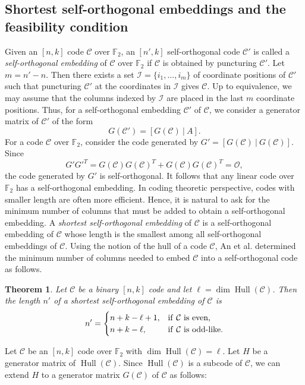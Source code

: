\documentclass{article}
\newtheorem{theorem}{Theorem}
\newcommand{\Hull}{\operatorname{Hull}}
\begin{document}
\subsection{Shortest self-orthogonal embeddings and the feasibility condition}
Given an $[n, k]$ code $\mathcal{C}$ over $\mathbb{F}_2$, an $[n', k]$ self-orthogonal code $\mathcal{C}'$ is called a \textit{self-orthogonal embedding} of $\mathcal{C}$ over $\mathbb{F}_2$ if $\mathcal{C}$ is obtained by puncturing $\mathcal{C}'$. Let $m = n'-n$. Then there exists a set $\mathcal{I}=\{i_1,\ldots,i_m\}$ of coordinate positions of $\mathcal{C}'$ such that puncturing $\mathcal{C}'$ at the coordinates in $\mathcal{I}$ gives $\mathcal{C}$. Up to equivalence, we may assume that the columns indexed by $\mathcal{I}$ are placed in the last $m$ coordinate positions. Thus, for a self-orthogonal embedding $\mathcal{C}'$ of $\mathcal{C}$, we consider a generator matrix of $\mathcal{C}'$ of the form \[
G(\mathcal{C}') = [G(\mathcal{C})~|~A].
\]
For a code $\mathcal{C}$ over $\mathbb{F}_2$, consider the code generated by $G' = [G(\mathcal{C})~|~G(\mathcal{C})]$. Since
\[
G'G'^T = G(\mathcal{C})G(\mathcal{C})^T + G(\mathcal{C})G(\mathcal{C})^T = \mathcal{O},
\]
the code generated by $G'$ is self-orthogonal. It follows that any linear code over $\mathbb{F}_2$ has a self-orthogonal embedding.
In coding theoretic perspective, codes with smaller length are often more efficient. Hence, it is natural to ask for the minimum number of columns that must be added to obtain a self-orthogonal embedding. A \textit{shortest self-orthogonal embedding} of $\mathcal{C}$ is a self-orthogonal embedding of $\mathcal{C}$ whose length is the smallest among all self-orthogonal embeddings of $\mathcal{C}$. Using the notion of the hull of a code $\mathcal{C}$, An et al. determined the minimum number of columns needed to embed $\mathcal{C}$ into a self-orthogonal code as follows.
\begin{theorem}\cite{akklw-2025}\label{akklw-2025}
    Let $\mathcal{C}$ be a binary $[n,k]$ code and let $\ell=\dim \Hull(\mathcal{C})$. Then the length $n'$ of a shortest self-orthogonal embedding of $\mathcal{C}$ is
    \[
    n' = \begin{cases}
        n+k-\ell+1,   &\mathrm{if~}\mathcal{C}\textup{~is~even,}\\
        n+k-\ell,     &\mathrm{if~}\mathcal{C}\textup{~is~odd-like.}
    \end{cases}
    \]
\end{theorem}
Let $\mathcal{C}$ be an $[n,k]$ code over $\mathbb{F}_2$ with $\dim\Hull(\mathcal{C}) = \ell$. Let $H$ be a generator matrix of $\Hull(\mathcal{C})$. Since $\Hull(\mathcal{C})$ is a subcode of $\mathcal{C}$, we can extend $H$ to a generator matrix $G(\mathcal{C})$ of $\mathcal{C}$ as follows:
\end{document}
